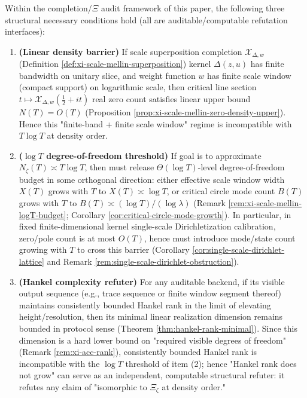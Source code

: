 \begin{theorem}\label{thm:xi-zero-statistics-log-budget-lower-bound}
Within the completion/\(\Xi\) audit framework of this paper, the following three structural necessary conditions hold (all are auditable/computable refutation interfaces):
\begin{enumerate}
  \item \textbf{(Linear density barrier)}
  If scale superposition completion \(\mathcal X_{\Delta,w}\) (Definition \ref{def:xi-scale-mellin-superposition}) kernel \(\Delta(z,u)\) has finite bandwidth on unitary slice, and weight function \(w\) has finite scale window (compact support) on logarithmic scale, then critical line section
  \(t\mapsto \mathcal X_{\Delta,w}(\tfrac12+it)\)
  real zero count satisfies linear upper bound \(N(T)=O(T)\) (Proposition \ref{prop:xi-scale-mellin-zero-density-upper}).
  Hence this "finite-band + finite scale window" regime is incompatible with \(T\log T\) at density order.

  \item \textbf{(\(\log T\) degree-of-freedom threshold)}
  If goal is to approximate \(N_\zeta(T)\asymp T\log T\), then must release \(\Theta(\log T)\)-level degree-of-freedom budget in some orthogonal direction:
  either effective scale window width \(X(T)\) grows with \(T\) to \(X(T)\asymp \log T\), or critical circle mode count \(B(T)\) grows with \(T\) to \(B(T)\asymp (\log T)/(\log\lambda)\)
  (Remark \ref{rem:xi-scale-mellin-logT-budget}; Corollary \ref{cor:critical-circle-mode-growth}).
  In particular, in fixed finite-dimensional kernel single-scale Dirichletization calibration, zero/pole count is at most \(O(T)\), hence must introduce mode/state count growing with \(T\) to cross this barrier (Corollary \ref{cor:single-scale-dirichlet-lattice} and Remark \ref{rem:single-scale-dirichlet-obstruction}).

  \item \textbf{(Hankel complexity refuter)}
  For any auditable backend, if its visible output sequence (e.g., trace sequence or finite window segment thereof) maintains consistently bounded Hankel rank in the limit of elevating height/resolution,
  then its minimal linear realization dimension remains bounded in protocol sense (Theorem \ref{thm:hankel-rank-minimal}).
  Since this dimension is a hard lower bound on "required visible degrees of freedom" (Remark \ref{rem:xi-acc-rank}), consistently bounded Hankel rank is incompatible with the \(\log T\) threshold of item (2);
  hence "Hankel rank does not grow" can serve as an independent, computable structural refuter: it refutes any claim of "isomorphic to \(\Xi_\zeta\) at density order."
\end{enumerate}
\end{theorem}

